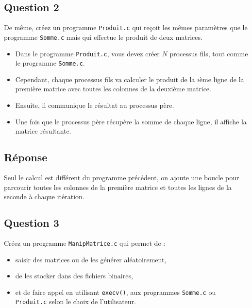\documentclass[
	12pt, %
]{fphw}
\begin{document}
\subsection*{Question 2}
\begin{problem}
De même, créez un programme \texttt{Produit.c} qui reçoit les mêmes paramètres que le programme \texttt{Somme.c} mais qui effectue le produit de deux matrices. 
\begin{itemize}
	\item Dans le programme \texttt{Produit.c}, vous devez créer $N$ processus fils, tout comme le programme \texttt{Somme.c}.
	\item Cependant, chaque processus fils va calculer le produit de la $i$ème ligne de la première matrice avec toutes les colonnes de la deuxième matrice.
	\item Ensuite, il communique le résultat au processus père.
	\item Une fois que le processus père récupère la somme de chaque ligne, il affiche la matrice résultante.
\end{itemize}
\end{problem}
\subsection*{Réponse}

Seul le calcul est différent du programme précédent, on ajoute une boucle pour parcourir toutes les colonnes de la première matrice et toutes les lignes de la seconde à chaque itération.
%

\subsection*{Question 3}
\begin{problem}
Créez un programme \texttt{ManipMatrice.c} qui permet de :
	\begin{itemize}
		\item saisir des matrices ou de les générer aléatoirement,
		\item de les stocker dans des fichiers binaires,
		\item et de faire appel en utilisant \texttt{execv()}, aux programmes \texttt{Somme.c} ou \texttt{Produit.c} selon le choix de l'utilisateur.
	\end{itemize}
\end{problem}
\end{document}
